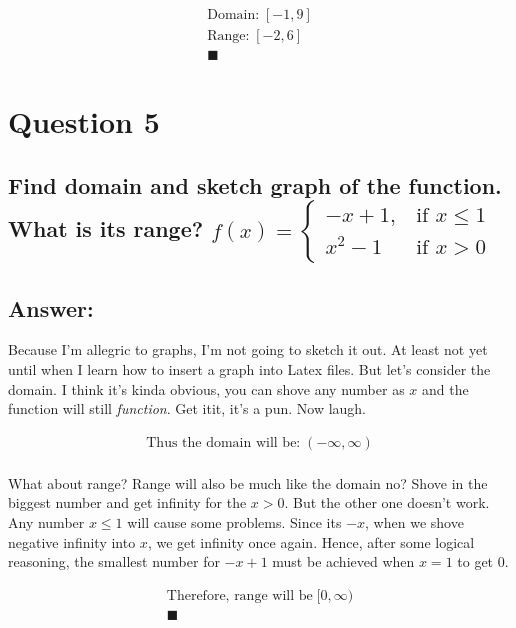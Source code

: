 \documentclass[17 pt]{extarticle}
\begin{document}
\begin{equation*}
    \begin{split}
        \text{Domain:} \; [-1,9] \\
        \text{Range:} \; [-2,6] \\ \blacksquare 
    \end{split}
    \end{equation*}

\section{Question 5}

\subsection*{Find domain and sketch graph of the function. What is its range? $f(x) = \begin{cases} -x+1, & \text{if } x \leq 1 \\
    x^2-1 & \text{if } x > 0 \end{cases}$}

\vspace{10mm}
\subsection*{Answer:}

Because I'm allegric to graphs, I'm not going to sketch it out. At least not yet until when I learn how to insert a graph into
Latex files. But let's consider the domain. I think it's kinda obvious, you can shove any number as \(x\) and the function will still 
\textit{function}. Get itit, it's a pun. Now laugh. 

\begin{equation*}
    \begin{split}
        \text{Thus the domain will be:} \; (- \infty, \infty) \\
    \end{split}
    \end{equation*}

What about range? Range will also be much like the domain no? Shove in the biggest number and get infinity for the \(x>0\). 
But the other one doesn't work. Any number \(x \leq 1\) will cause some problems. Since its \(-x\), when we shove negative infinity into \(x\), 
we get infinity once again. Hence, after some logical reasoning, the smallest number for \(-x+1\) must be achieved when \(x=1\) to get \(0\).

\begin{equation*}
    \begin{split}
        \text{Therefore, range will be} \; [0, \infty) \\ \blacksquare 
    \end{split}
    \end{equation*}


\enddocument{}
\end{document}
